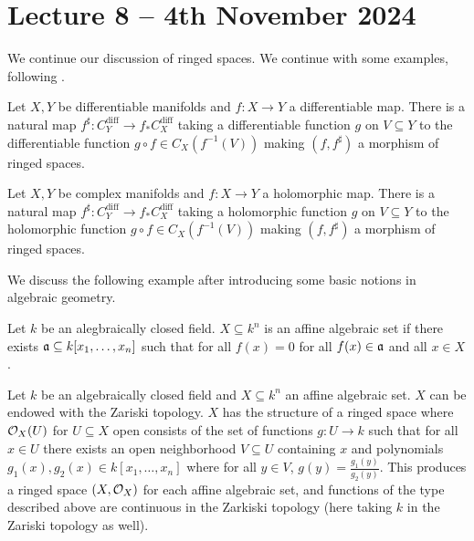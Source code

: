 \section{Lecture 8 -- 4th November 2024}\label{sec: lecture 8}
We continue our discussion of ringed spaces. We continue with some examples, following . 
\begin{example}
    Let $X,Y$ be differentiable manifolds and $f:X\to Y$ a differentiable map. There is a natural map $f^{\sharp}:C^{\mathrm{diff}}_{Y}\to f_{*}C^{\mathrm{diff}}_{X}$ taking a differentiable function $g$ on $V\subseteq Y$ to the differentiable function $g\circ f\in C_{X}(f^{-1}(V))$ making $(f,f^{\sharp})$ a morphism of ringed spaces. 
\end{example}
\begin{example}
    Let $X,Y$ be complex manifolds and $f:X\to Y$ a holomorphic map. There is a natural map $f^{\sharp}:C^{\mathrm{diff}}_{Y}\to f_{*}C^{\mathrm{diff}}_{X}$ taking a holomorphic function $g$ on $V\subseteq Y$ to the holomorphic function $g\circ f\in C_{X}(f^{-1}(V))$ making $(f,f^{\sharp})$ a morphism of ringed spaces.
\end{example}
We discuss the following example after introducing some basic notions in algebraic geometry. 
\begin{definition}\label{def: affine algebraic set}
    Let $k$ be an alegbraically closed field. $X\subseteq k^{n}$ is an affine algebraic set if there exists $\mathfrak{a}\subseteq k[x_{1},\dots,x_{n}]$ such that for all $f(x)=0$ for all $f(x)\in\mathfrak{a}$ and all $x\in X$. 
\end{definition}
\begin{example}\label{ex: affine algebraic sets}
    Let $k$ be an algebraically closed field and $X\subseteq k^{n}$ an affine algebraic set. $X$ can be endowed with the Zariski topology. $X$ has the structure of a ringed space where $\mathcal{O}_{X}(U)$ for $U\subseteq X$ open consists of the set of functions $g:U\to k$ such that for all $x\in U$ there exists an open neighborhood $V\subseteq U$ containing $x$ and polynomials $g_{1}(x),g_{2}(x)\in k[x_{1},\dots,x_{n}]$ where for all $y\in V$, $g(y)=\frac{g_{1}(y)}{g_{2}(y)}$. This produces a ringed space $(X,\mathcal{O}_{X})$ for each affine algebraic set, and functions of the type described above are continuous in the Zarkiski topology (here taking $k$ in the Zariski topology as well). 
\end{example}
